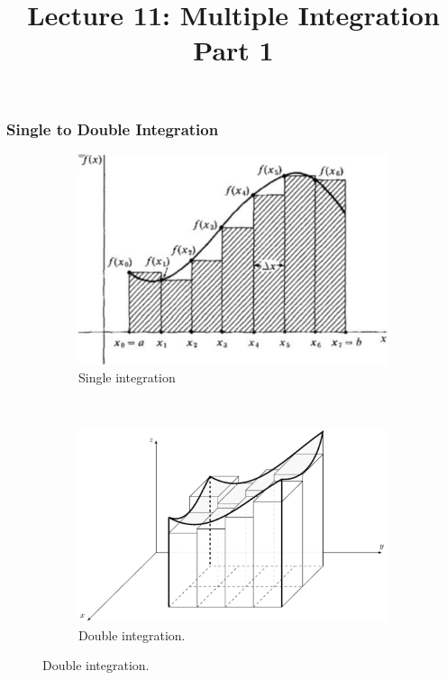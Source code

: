 \documentclass{beamer}
\title{Lecture 11: Multiple Integration Part 1}
\begin{document}
	
\frame{\titlepage}

\begin{frame}
\frametitle{Single to Double Integration}
\begin{figure}
	\centering
	\begin{subfigure}{0.48\textwidth}
		
		\includegraphics[width=\textwidth]{IMG_0380.jpg}
		\hspace*{10pt}\hbox{}
		\caption{Single integration}
	\end{subfigure}%
	~ 
	\begin{subfigure}{0.48\textwidth}
	
		\includegraphics[width=\textwidth]{IMG_0385.jpg}
		\hspace*{10pt}\hbox{}
		\caption{Double integration.}
		\label{fig:2}
	\end{subfigure}
\end{figure}

\end{frame}
\end{document}
